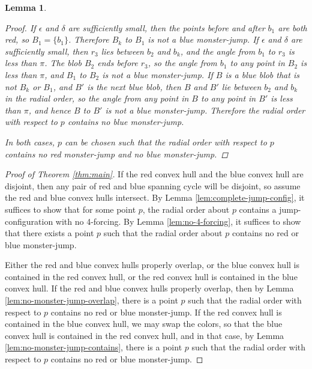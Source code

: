 \documentclass[12pt]{article}
\newtheorem{lemma}{Lemma}
\theoremstyle{definition}
\begin{document}
\begin{lemma}
\begin{proof}
    If $\epsilon$ and $\delta$ are sufficiently small, then the points before and after $b_1$ are both red, so $B_1=\{b_1\}$.
    Therefore $B_k$ to $B_1$ is not a blue monster-jump.
    If $\epsilon$ and $\delta$ are sufficiently small, then $r_3$ lies between $b_2$ and $b_k$, and the angle from $b_1$ to $r_3$ is less than $\pi$.
    The blob $B_2$ ends before $r_3$, so the angle from $b_1$ to any point in $B_2$ is less than $\pi$, and $B_1$ to $B_2$ is not a blue monster-jump.
    If $B$ is a blue blob that is not $B_k$ or $B_1$, and $B'$ is the next blue blob, then $B$ and $B'$ lie between $b_2$ and $b_k$ in the radial order, so the angle from any point in $B$ to any point in $B'$ is less than $\pi$, and hence $B$ to $B'$ is not a blue monster-jump.
    Therefore the radial order with respect to $p$ contains no blue monster-jump.

    In both cases, $p$ can be chosen such that the radial order with respect to $p$ contains no red monster-jump and no blue monster-jump.
  \end{proof}
\end{lemma}

\begin{proof}[Proof of Theorem \ref{thm:main}]
If the red convex hull and the blue convex hull are disjoint, then any pair of red and blue spanning cycle will be disjoint, so assume the red and blue convex hulls intersect.
By Lemma \ref{lem:complete-jump-config}, it suffices to show that for some point $p$, the radial order about $p$ contains a jump-configuration with no 4-forcing.
By Lemma \ref{lem:no-4-forcing}, it suffices to show that there exists a point $p$ such that the radial order about $p$ contains no red or blue monster-jump.

Either the red and blue convex hulls properly overlap, or the blue convex hull is contained in the red convex hull, or the red convex hull is contained in the blue convex hull.
If the red and blue convex hulls properly overlap, then by Lemma \ref{lem:no-monster-jump-overlap}, there is a point $p$ such that the radial order with respect to $p$ contains no red or blue monster-jump.
If the red convex hull is contained in the blue convex hull, we may swap the colors, so that the blue convex hull is contained in the red convex hull, and in that case, by Lemma \ref{lem:no-monster-jump-contains}, there is a point $p$ such that the radial order with respect to $p$ contains no red or blue monster-jump.
\end{proof}

{}

\end{document}
